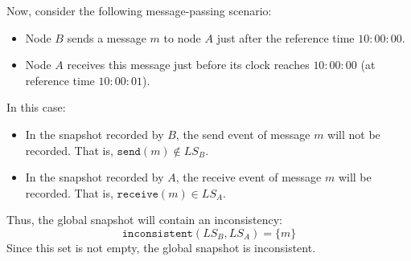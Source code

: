 Now, consider the following message-passing scenario:  
\begin{itemize}
    \item Node \(B\) sends a message \(m\) to node \(A\) just after the reference time \(10{:}00{:}00\).  
    \item Node \(A\) receives this message just before its clock reaches \(10{:}00{:}00\) (at reference time \(10{:}00{:}01\)).  
\end{itemize}

In this case:  
\begin{itemize}
    \item In the snapshot recorded by \(B\), the send event of message \(m\) will not be recorded. That is, \(\texttt{send}(m) \notin LS_B\).
    \item In the snapshot recorded by \(A\), the receive event of message \(m\) will be recorded. That is, \(\texttt{receive}(m) \in LS_A\).
\end{itemize}

Thus, the global snapshot will contain an inconsistency:  
\[
\texttt{inconsistent}(LS_B, LS_A) = \{m\}
\]
Since this set is not empty, the global snapshot is inconsistent.
